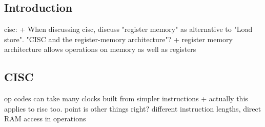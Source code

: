 
\subsection{Introduction}

cisc:
+ When discussing cisc, discuss "register memory" as alternative to "Load store". "CISC and the register-memory architecture"?
+ register memory architecture allows operations on memory as well as registers

\subsection{CISC}
op codes can take many clocks built from simpler instructions
+ actually this applies to risc too. point is other things right? different instruction lengths, direct RAM access in operations



